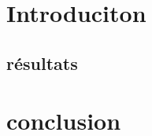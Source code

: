 \documentclass[a4paper,11pt]{article}
\author{Luca Veyrin-Forrer\\ Yani}
\title{}
\date{\today}
\begin{document}
	\maketitle
	\section{Introduciton} %
	\label{sec:introduciton}
	
	\subsection{résultats} %
	\label{sub:résultats}
	
	\section{conclusion} %
	\label{sec:conclusion}
	
\end{document}
